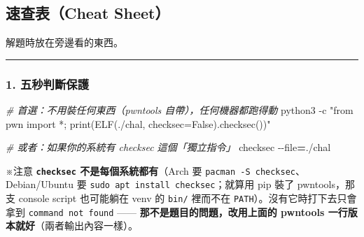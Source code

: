 \documentclass[10pt,a4paper]{article}
\newenvironment{Shaded}{\begin{snugshade}}{\end{snugshade}}
\newcommand{\AttributeTok}[1]{\textcolor[rgb]{0.13,0.29,0.53}{#1}}
\newcommand{\CommentTok}[1]{\textcolor[rgb]{0.56,0.35,0.01}{\textit{#1}}}
\newcommand{\ExtensionTok}[1]{#1}
\newcommand{\NormalTok}[1]{#1}
\newcommand{\OperatorTok}[1]{\textcolor[rgb]{0.81,0.36,0.00}{\textbf{#1}}}
\newcommand{\StringTok}[1]{\textcolor[rgb]{0.31,0.60,0.02}{#1}}
\renewenvironment{Shaded}{%
  \def\FrameCommand{\fboxsep=3.2pt\colorbox{shadecolor}}%
  \MakeFramed{\advance\hsize-\width\FrameRestore\small}%
}{%
  \endMakeFramed
}
\renewenvironment{quote}{%
  \begin{mdframed}[linewidth=0pt,innerleftmargin=0pt,innerrightmargin=0pt,
    innerbottommargin=0pt,innertopmargin=0pt,skipabove=0.55em,skipbelow=0.55em,
    leftmargin=0.9em,rightmargin=0.4em,startcode={\color{quotebar}\vrule width 2.6pt},%
    endcode={}]%
  \itshape\color{black}%
}{%
  \end{mdframed}%
}
\begin{document}
\subsection{速查表（Cheat Sheet）}\label{ux901fux67e5ux8868cheat-sheet}

解題時放在旁邊看的東西。

\begin{center}\rule{0.5\linewidth}{0.5pt}\end{center}

\subsubsection{1.
五秒判斷保護}\label{ux4e94ux79d2ux5224ux65b7ux4fddux8b77}

\begin{Shaded}
\begin{Highlighting}[]
\CommentTok{\# 首選：不用裝任何東西（pwntools 自帶），任何機器都跑得動}
\ExtensionTok{python3} \AttributeTok{{-}c} \StringTok{"from pwn import *; print(ELF(\textquotesingle{}./chal\textquotesingle{}, checksec=False).checksec())"}

\CommentTok{\# 或者：如果你的系統有 \textasciigrave{}checksec\textasciigrave{} 這個「獨立指令」}
\ExtensionTok{checksec} \AttributeTok{{-}{-}file}\OperatorTok{=}\NormalTok{./chal}
\end{Highlighting}
\end{Shaded}

\begin{quote}
※注意 \textbf{\texttt{checksec} 不是每個系統都有}（Arch 要
\texttt{pacman\ \allowbreak{}-\allowbreak{}S\ \allowbreak{}checksec}、Debian/Ubuntu 要
\texttt{sudo\ \allowbreak{}apt\ \allowbreak{}install\ \allowbreak{}checksec}；就算用 pip 裝了 pwntools，那支
console script 也可能躺在 venv 的 \texttt{bin/} 裡而不在
\texttt{PATH}）。沒有它時打下去只會拿到 \texttt{command\ \allowbreak{}not\ \allowbreak{}found}
------ \textbf{那不是題目的問題，改用上面的 pwntools
一行版本就好}（兩者輸出內容一樣）。
\end{quote}
\end{document}
